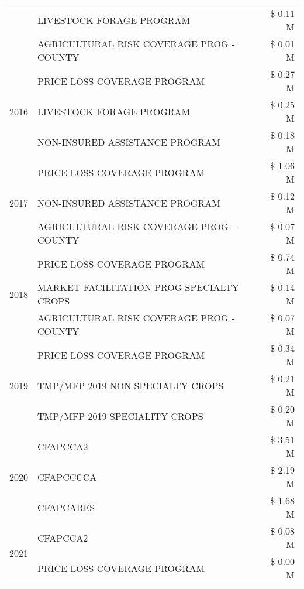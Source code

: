 \begin{tabular}{llr}
 & LIVESTOCK FORAGE PROGRAM & \$ 0.11 M \\
 & AGRICULTURAL RISK COVERAGE PROG - COUNTY & \$ 0.01 M \\
\cline{1-3}
\multirow[t]{3}{*}{2016} & PRICE LOSS COVERAGE PROGRAM & \$ 0.27 M \\
 & LIVESTOCK FORAGE PROGRAM & \$ 0.25 M \\
 & NON-INSURED ASSISTANCE PROGRAM & \$ 0.18 M \\
\cline{1-3}
\multirow[t]{3}{*}{2017} & PRICE LOSS COVERAGE PROGRAM & \$ 1.06 M \\
 & NON-INSURED ASSISTANCE PROGRAM & \$ 0.12 M \\
 & AGRICULTURAL RISK COVERAGE PROG - COUNTY & \$ 0.07 M \\
\cline{1-3}
\multirow[t]{3}{*}{2018} & PRICE LOSS COVERAGE PROGRAM & \$ 0.74 M \\
 & MARKET FACILITATION PROG-SPECIALTY CROPS & \$ 0.14 M \\
 & AGRICULTURAL RISK COVERAGE PROG - COUNTY & \$ 0.07 M \\
\cline{1-3}
\multirow[t]{3}{*}{2019} & PRICE LOSS COVERAGE PROGRAM & \$ 0.34 M \\
 & TMP/MFP 2019 NON SPECIALTY CROPS & \$ 0.21 M \\
 & TMP/MFP 2019 SPECIALITY CROPS & \$ 0.20 M \\
\cline{1-3}
\multirow[t]{3}{*}{2020} & CFAPCCA2 & \$ 3.51 M \\
 & CFAPCCCCA & \$ 2.19 M \\
 & CFAPCARES & \$ 1.68 M \\
\cline{1-3}
\multirow[t]{2}{*}{2021} & CFAPCCA2 & \$ 0.08 M \\
 & PRICE LOSS COVERAGE PROGRAM & \$ 0.00 M \\
\cline{1-3}
\bottomrule
\end{tabular}
